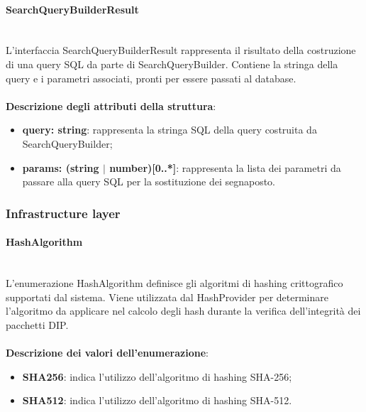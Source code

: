 \documentclass[a4paper,12pt]{article}
\begin{document}
{{{                \paragraph{SearchQueryBuilderResult}\label{par:SearchQueryBuilderResult}\mbox{}\\
                L'interfaccia SearchQueryBuilderResult rappresenta il risultato della costruzione di una query SQL da parte di SearchQueryBuilder. Contiene la stringa della query e i parametri associati, pronti per essere passati al database.\\
                \\
                \textbf{Descrizione degli attributi della struttura}:
                \begin{itemize}
                    \item \textbf{query: string}: rappresenta la stringa SQL della query costruita da SearchQueryBuilder;
                    \item \textbf{params: (string $|$ number)[0..*]}: rappresenta la lista dei parametri da passare alla query SQL per la sostituzione dei segnaposto.
                \end{itemize}
            }

            \subsubsection{Infrastructure layer} {
                \paragraph{HashAlgorithm}\label{par:HashAlgorithm}\mbox{}\\
                L'enumerazione HashAlgorithm definisce gli algoritmi di hashing crittografico supportati dal sistema. Viene utilizzata dal HashProvider per determinare l'algoritmo da applicare nel calcolo degli hash durante la verifica dell'integrità dei pacchetti DIP.\\
                \\
                \textbf{Descrizione dei valori dell'enumerazione}:
                \begin{itemize}
                    \item \textbf{SHA256}: indica l'utilizzo dell'algoritmo di hashing SHA-256;
                    \item \textbf{SHA512}: indica l'utilizzo dell'algoritmo di hashing SHA-512.
                \end{itemize}
}}}
\end{document}
